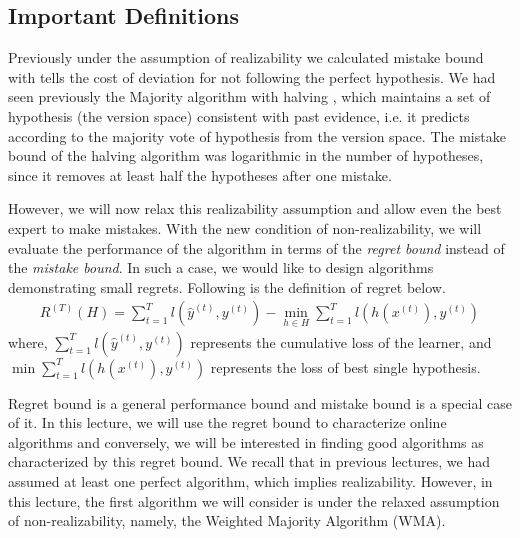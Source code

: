 \documentclass[11pt]{article}
\DeclareMathOperator*{\minimize}{min}
\begin{document}
\subsection{Important Definitions}


\normalfont
Previously under the assumption of realizability we calculated mistake bound with tells the cost of deviation for not following the perfect hypothesis. We had seen previously the Majority algorithm with halving , which maintains a set of hypothesis (the version space) consistent with past evidence, i.e. it predicts according to the majority vote of hypothesis from the version space. The mistake bound of the halving algorithm  was logarithmic in the number of hypotheses, since it removes at least half the hypotheses after one mistake. 

However, we will now relax this realizability assumption and allow even the best expert to make mistakes. With the new condition of non-realizability, we will evaluate the performance of the algorithm in terms of the \textit{regret bound} instead of the \textit{mistake bound}. In such a case, we would like to design algorithms demonstrating small regrets. Following is the definition of regret below.
\begin{align}
    R^{(T)}(H)=\sum_{t=1}^{T} l(\hat{y}^{(t)}, y^{(t)}) - \minimize_{h\in H}  \sum_{t=1}^{T} l(h(x^{(t)}), y^{(t)})\label{def:regret}
\end{align}
\normalfont
where, $\sum_{t=1}^{T} l(\hat{y}^{(t)}, y^{(t)})$ represents the cumulative loss of the learner, and $\minimize\sum_{t=1}^{T} l(h(x^{(t)}), y^{(t)})$ represents the loss of best single hypothesis. 

Regret bound is a general performance bound and mistake bound is a special case of it. In this lecture, we will use the regret bound to characterize online algorithms and conversely, we will be interested in finding good algorithms as characterized by this regret bound. We recall that in previous lectures, we had assumed at least one perfect algorithm, which implies realizability. However, in this lecture, the first algorithm we will consider is under the relaxed assumption of non-realizability, namely, the Weighted Majority Algorithm (WMA).
\end{document}
